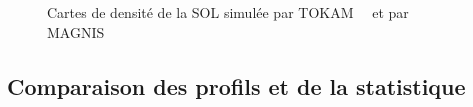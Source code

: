 \begin{refsection}
\begin{figure}[!htbp]
  \centering
    \caption{Cartes de densité de la SOL simulée par
    TOKAM~~ et par MAGNIS~}
    \label{pandas}
\end{figure}
\subsection{Comparaison des profils et de la statistique}


\end{refsection}
